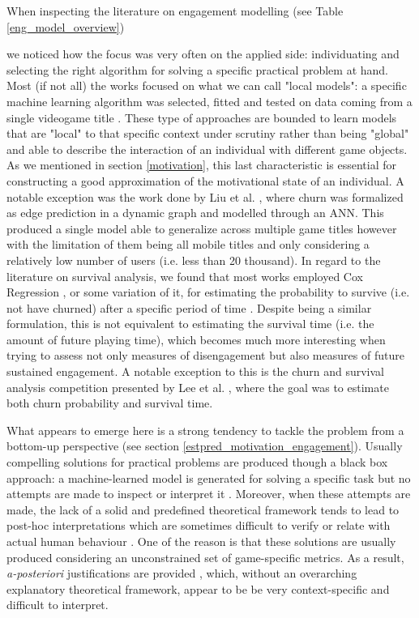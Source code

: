 When inspecting the literature on engagement modelling (see Table \ref{eng_model_overview}) 



we noticed how the focus was very often on the applied side: individuating and selecting the right algorithm for solving a specific practical problem at hand. Most (if not all) the works focused on what we can call "local models": a specific machine learning algorithm was selected, fitted and tested on data coming from a single videogame title \cite{runge2014churn, hadiji2014predicting, xie2015predicting, kim2017churn}. These type of approaches are bounded to learn models that are "local" to that specific context under scrutiny rather than being "global" and able to describe the interaction of an individual with different game objects. As we mentioned in section \ref{motivation}, this last characteristic is essential for constructing a good approximation of the motivational state of an individual. A notable exception was the work done by Liu et al. \cite{liu2018semi}, where churn was formalized as edge prediction in a dynamic graph and modelled through an ANN. This produced a single model able to generalize across multiple game titles however with the limitation of them being all mobile titles and only considering a relatively low number of users (i.e. less than 20 thousand). In regard to the literature on survival analysis, we found that most works employed Cox Regression \cite{cox1972regression}, or some variation of it, for estimating the probability to survive (i.e. not have churned) after a specific period of time \cite{perianez2016churn, bertens2017games, demediuk2018player}. Despite being a similar formulation, this is not equivalent to estimating the survival time (i.e. the amount of future playing time), which becomes much more interesting when trying to assess not only measures of disengagement but also measures of future sustained engagement. A notable exception to this is the churn and survival analysis competition presented by Lee et al. \cite{lee2018game}, where the goal was to estimate both churn probability and survival time. 

What appears to emerge here is a strong tendency to tackle the problem from a bottom-up perspective (see section \ref{estpred_motivation_engagement}). Usually compelling solutions for practical problems are produced though a black box approach: a machine-learned model is generated for solving a specific task but no attempts are made to inspect or interpret it \cite{lee2018game, liu2019micro, del2020time, kristensen2019combining}. Moreover, when these attempts are made, the lack of a solid and predefined theoretical framework tends to lead to post-hoc interpretations which are sometimes difficult to verify or relate with actual human behaviour \cite{drachen2016rapid, del2019profiling}. One of the reason is that these solutions are usually produced considering an unconstrained set of game-specific metrics. As a result, \textit{a-posteriori} justifications are provided \cite{drachen2012guns, makarovych2018like, drachen2009player}, which, without an overarching explanatory theoretical framework, appear to be be very context-specific and difficult to interpret. 

